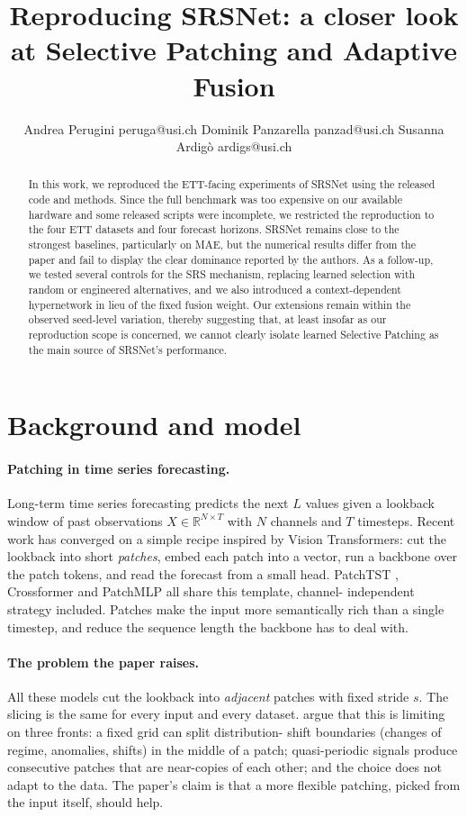 \documentclass[10pt]{article}
\title{Reproducing SRSNet: a closer look at Selective Patching
and Adaptive Fusion}
\author{%
  \name Andrea Perugini \email peruga@usi.ch
  \AND
  \name Dominik Panzarella \email panzad@usi.ch
  \AND
  \name Susanna Ardig\`o \email ardigs@usi.ch
}
\begin{document}
\maketitle

\begin{abstract}
In this work, we reproduced the ETT-facing experiments of SRSNet using the released code and methods. Since the full
benchmark was too expensive on our available hardware and some released scripts were incomplete, we restricted the
reproduction to the four ETT datasets and four forecast horizons. SRSNet remains close to the strongest baselines,
particularly on MAE, but the numerical results differ from the paper and fail to display the clear
dominance reported by the authors. As a follow-up, we tested several controls for the SRS mechanism, replacing
learned selection with random or engineered alternatives, and we also introduced a context-dependent hypernetwork
in lieu of the fixed fusion weight. Our extensions remain within the observed seed-level variation, thereby
suggesting that, at least insofar as our reproduction scope is concerned, we cannot clearly isolate learned Selective
Patching as the main source of SRSNet's performance.
\end{abstract}

\section{Background and model}

\paragraph{Patching in time series forecasting.}
Long-term time series forecasting predicts the next $L$ values
given a lookback window of past observations $X \in \mathbb{R}^{N
\times T}$ with $N$ channels and $T$ timesteps. Recent work has
converged on a simple recipe inspired by Vision Transformers: cut
the lookback into short \emph{patches}, embed each patch into a
vector, run a backbone over the patch tokens, and read the
forecast from a small head. PatchTST \citep{nie2023patchtst},
Crossformer \citep{zhang2022crossformer} and PatchMLP
\citep{tang2025patchmlp} all share this template, channel-
independent strategy included. Patches make the input more
semantically rich than a single timestep, and reduce the sequence
length the backbone has to deal with.

\paragraph{The problem the paper raises.}
All these models cut the lookback into \emph{adjacent} patches
with fixed stride $s$. The slicing is the same for every input
and every dataset. \citet{wu2025srsnet} argue that this is
limiting on three fronts: a fixed grid can split distribution-
shift boundaries (changes of regime, anomalies, shifts) in the
middle of a patch; quasi-periodic signals produce consecutive
patches that are near-copies of each other; and the choice does
not adapt to the data. The paper's claim is that a more flexible
patching, picked from the input itself, should help.
\end{document}
